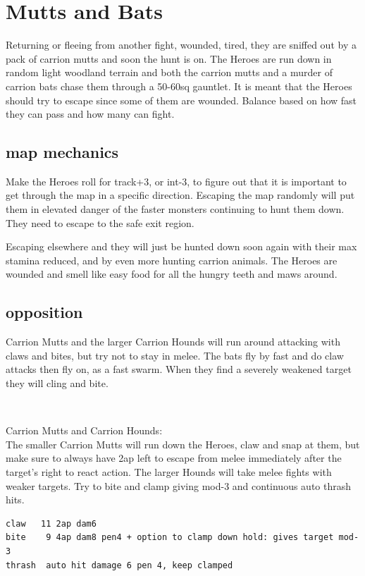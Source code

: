 \section*{Mutts and Bats}
Returning or fleeing from another fight, wounded, tired, they are sniffed out by a pack of carrion mutts and soon the hunt is on. The Heroes are run down in random light woodland terrain and both the carrion mutts and a murder of carrion bats chase them through a 50-60sq gauntlet.
It is meant that the Heroes should try to escape since some of them are wounded. Balance based on how fast they can pass and how many can fight.


\subsection*{map mechanics}
Make the Heroes roll for track+3, or int-3, to figure out that it is important to get through the map in a specific direction. Escaping the map randomly will put them in elevated danger of the faster monsters continuing to hunt them down. They need to escape to the safe exit region.

Escaping elsewhere and they will just be hunted down soon again with their max stamina reduced, and by even more hunting carrion animals. The Heroes are wounded and smell like easy food for all the hungry teeth and maws around.


\subsection*{opposition}
Carrion Mutts and the larger Carrion Hounds will run around attacking with claws and bites, but try not to stay in melee. The bats fly by fast and do claw attacks then fly on, as a fast swarm. When they find a severely weakened target they will cling and bite.

\

Carrion Mutts and Carrion Hounds:\\
The smaller Carrion Mutts will run down the Heroes, claw and snap at them, but make sure to always have 2ap left to escape from melee immediately after the target's right to react action.
The larger Hounds will take melee fights with weaker targets. Try to bite and clamp giving mod-3 and continuous auto thrash hits.
\small \begin{verbatim}
claw   11 2ap dam6
bite    9 4ap dam8 pen4 + option to clamp down hold: gives target mod-3
thrash  auto hit damage 6 pen 4, keep clamped

\end{verbatim} \normalsize

